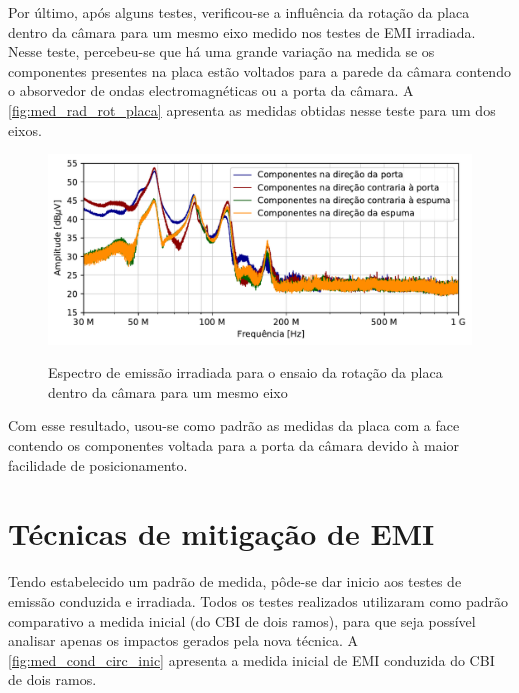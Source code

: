     Por último, após alguns testes, verificou-se a influência da rotação da placa dentro da câmara para um mesmo eixo medido nos testes de EMI irradiada. Nesse teste, percebeu-se que há uma grande variação na medida se os componentes presentes na placa estão voltados para a parede da câmara contendo o absorvedor de ondas electromagnéticas ou a porta da câmara. A \autoref{fig:med_rad_rot_placa} apresenta as medidas obtidas nesse teste para um dos eixos.
    
    \begin{figure}[H]
    	\centering
    	\caption{Espectro de emissão irradiada para o ensaio da rotação da placa dentro da câmara para um mesmo eixo}
    	\includegraphics[scale=.9]{pdf/rad/rotacionando.pdf}
    	\label{fig:med_rad_rot_placa}
    \end{figure}
    
    Com esse resultado, usou-se como padrão as medidas da placa com a face contendo os componentes voltada para a porta da câmara devido à maior facilidade de posicionamento.
    
    \section{Técnicas de mitigação de EMI} \label{cap:result_tecnicas}
    
    Tendo estabelecido um padrão de medida, pôde-se dar inicio aos testes de emissão conduzida e irradiada. Todos os testes realizados utilizaram como padrão comparativo a medida inicial (do CBI de dois ramos), para que seja possível analisar apenas os impactos gerados pela nova técnica. A \autoref{fig:med_cond_circ_inic} apresenta a medida inicial de EMI conduzida do CBI de dois ramos. 
    
